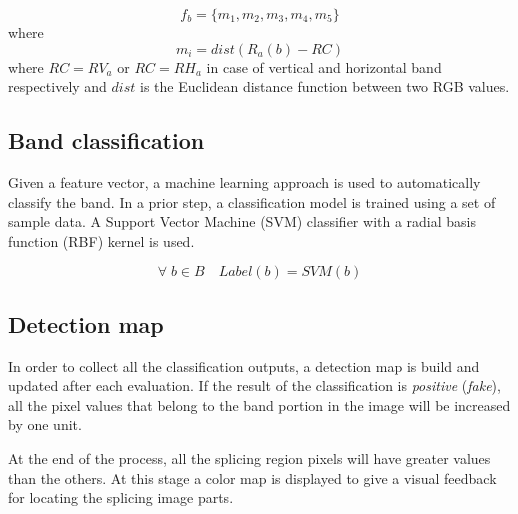 \begin{equation}\label{eq:regionsfeaturevector}
f_{b} = \{m_1, m_2, m_3, m_4, m_5\}
\end{equation}
where
$$
m_i = dist(R_a(b) - RC)
$$
where $RC = RV_a$ or $RC = RH_a$ in case of vertical and horizontal band respectively and $dist$ is the Euclidean distance function between two RGB values.

\subsection{Band classification}

Given a feature vector, a machine learning approach is used to automatically classify the band. 
In a prior step, a classification model is trained using a set of sample data. A Support Vector Machine (SVM) classifier with a radial basis function (RBF) kernel is used.

$$
\forall \; b \in B \quad Label(b) = SVM(b)
$$

\subsection{Detection map}

In order to collect all the classification outputs, a detection map is build and updated after each evaluation. If the result of the classification is \emph{positive} (\emph{fake}), all the pixel values that belong to the band portion in the image will be increased by one unit.

At the end of the process, all the splicing region pixels will have greater values than the others. At this stage a color map is displayed to give a visual feedback for locating the splicing image parts.


